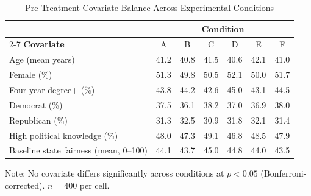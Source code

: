 \begin{table}[h!]
\centering
\caption{Pre-Treatment Covariate Balance Across Experimental Conditions}
\label{tab:balance}
\begin{threeparttable}
\begin{tabular}{lcccccc}
\toprule
 & \multicolumn{6}{c}{\textbf{Condition}} \\
\cmidrule(lr){2-7}
\textbf{Covariate} & A & B & C & D & E & F \\
\midrule
Age (mean years)         & 41.2 & 40.8 & 41.5 & 40.6 & 42.1 & 41.0 \\
Female (\%)              & 51.3 & 49.8 & 50.5 & 52.1 & 50.0 & 51.7 \\
Four-year degree+ (\%)   & 43.8 & 44.2 & 42.6 & 45.0 & 43.1 & 44.5 \\
Democrat (\%)            & 37.5 & 36.1 & 38.2 & 37.0 & 36.9 & 38.0 \\
Republican (\%)          & 31.3 & 32.5 & 30.9 & 31.8 & 32.1 & 31.4 \\
High political knowledge (\%) & 48.0 & 47.3 & 49.1 & 46.8 & 48.5 & 47.9 \\
Baseline state fairness (mean, 0--100) & 44.1 & 43.7 & 45.0 & 44.8 & 44.0 & 43.5 \\
\bottomrule
\end{tabular}
\begin{tablenotes}
\small \item Note: No covariate differs significantly across conditions at $p < 0.05$ (Bonferroni-corrected). $n = 400$ per cell.
\end{tablenotes}
\end{threeparttable}
\end{table}
